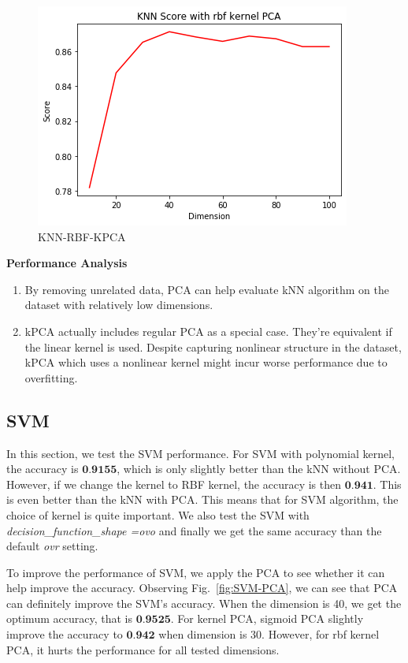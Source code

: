 \documentclass[12pt]{article}
\begin{document}
\begin{figure}[htpb]
\begin{minipage}{0.3\textwidth}
		\includegraphics[width=\linewidth]{./exp-figs/KNN-RBF-KPCA.png}
		\caption{KNN-RBF-KPCA}
		\label{fig:KNN-RBF-KPCA}
	\end{minipage}
\end{figure}

\textbf{Performance Analysis} 

\begin{enumerate}[label=(\roman*)]
	\item By removing unrelated data, PCA can help evaluate kNN algorithm on the dataset with relatively low dimensions. 
	\item kPCA actually includes regular PCA as a special case. They're equivalent if the linear kernel is used. Despite capturing nonlinear structure in the dataset, kPCA which uses a nonlinear kernel might incur worse performance due to overfitting.
\end{enumerate}


\subsection{SVM}
In this section, we test the SVM performance. For SVM with polynomial kernel, the accuracy is $\textbf{0.9155}$, which is only slightly better than the kNN without PCA. However, if we change the kernel to RBF kernel, the accuracy is then $\textbf{0.941}$. This is even better than the kNN with PCA. This means that for SVM algorithm, the choice of kernel is quite important. We also test the SVM with \emph{decision\_function\_shape =ovo} and finally we get the same accuracy than the default \emph{ovr} setting.

To improve the performance of SVM, we apply the PCA to see whether it can help improve the accuracy. Observing Fig.~\ref{fig:SVM-PCA}, we can see that PCA can definitely improve the SVM's accuracy. When the dimension is 40, we get the optimum accuracy, that is $\textbf{0.9525}$. For kernel PCA, sigmoid PCA slightly improve the accuracy to $\textbf{0.942}$ when dimension is 30. However, for rbf kernel PCA, it hurts the performance for all tested dimensions.
\end{document}
